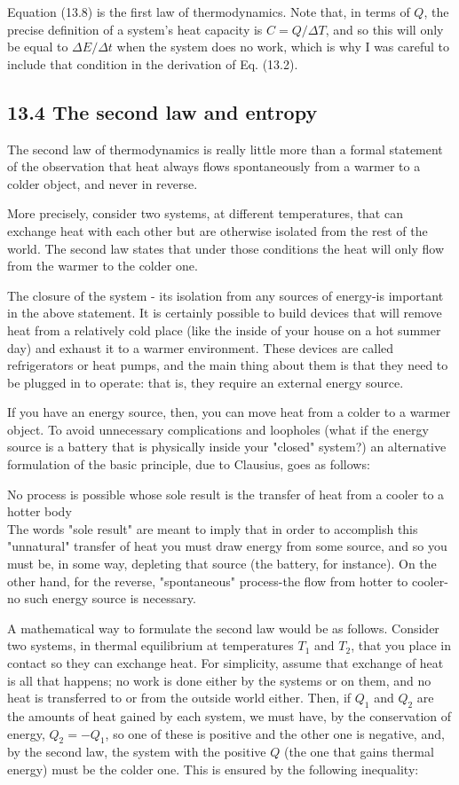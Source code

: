 \documentclass[10pt]{article}
\begin{document}
Equation (13.8) is the first law of thermodynamics. Note that, in terms of $Q$, the precise definition of a system's heat capacity is $C=Q / \Delta T$, and so this will only be equal to $\Delta E / \Delta t$ when the system does no work, which is why I was careful to include that condition in the derivation of Eq. (13.2).

\subsection*{13.4 The second law and entropy}
The second law of thermodynamics is really little more than a formal statement of the observation that heat always flows spontaneously from a warmer to a colder object, and never in reverse.

More precisely, consider two systems, at different temperatures, that can exchange heat with each other but are otherwise isolated from the rest of the world. The second law states that under those conditions the heat will only flow from the warmer to the colder one.

The closure of the system - its isolation from any sources of energy-is important in the above statement. It is certainly possible to build devices that will remove heat from a relatively cold place (like the inside of your house on a hot summer day) and exhaust it to a warmer environment. These devices are called refrigerators or heat pumps, and the main thing about them is that they need to be plugged in to operate: that is, they require an external energy source.

If you have an energy source, then, you can move heat from a colder to a warmer object. To avoid unnecessary complications and loopholes (what if the energy source is a battery that is physically inside your "closed" system?) an alternative formulation of the basic principle, due to Clausius, goes as follows:

No process is possible whose sole result is the transfer of heat from a cooler to a hotter body\\
The words "sole result" are meant to imply that in order to accomplish this "unnatural" transfer of heat you must draw energy from some source, and so you must be, in some way, depleting that source (the battery, for instance). On the other hand, for the reverse, "spontaneous" process-the flow from hotter to cooler-no such energy source is necessary.

A mathematical way to formulate the second law would be as follows. Consider two systems, in thermal equilibrium at temperatures $T_{1}$ and $T_{2}$, that you place in contact so they can exchange heat. For simplicity, assume that exchange of heat is all that happens; no work is done either by the systems or on them, and no heat is transferred to or from the outside world either. Then, if $Q_{1}$ and $Q_{2}$ are the amounts of heat gained by each system, we must have, by the conservation of energy, $Q_{2}=-Q_{1}$, so one of these is positive and the other one is negative, and, by the second law, the system with the positive $Q$ (the one that gains thermal energy) must be the colder one. This is ensured by the following inequality:
\end{document}
